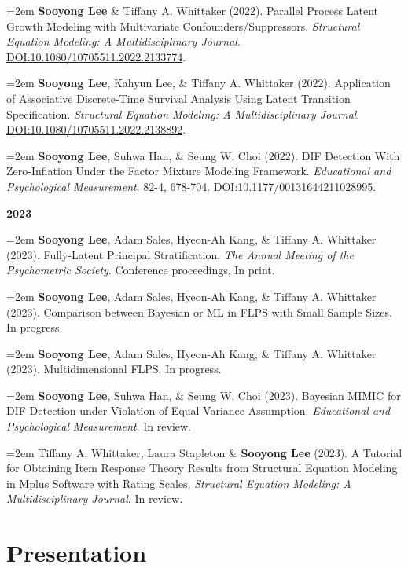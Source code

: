 \documentclass[11pt,letterpaper,]{awesome-me}
\begin{document}
\hangindent=2em  \textbf{Sooyong Lee} \& Tiffany A.
Whittaker (2022). Parallel Process Latent Growth Modeling with
Multivariate Confounders/Suppressors. \emph{Structural Equation
Modeling: A Multidisciplinary Journal}.
\url{DOI:10.1080/10705511.2022.2133774}.

\hangindent=2em  \textbf{Sooyong Lee}, Kahyun Lee, \&
Tiffany A. Whittaker (2022). Application of Associative Discrete-Time
Survival Analysis Using Latent Transition Specification.
\emph{Structural Equation Modeling: A Multidisciplinary Journal}.
\url{DOI:10.1080/10705511.2022.2138892}.

\hangindent=2em  \textbf{Sooyong Lee}, Suhwa Han, \& Seung
W. Choi (2022). DIF Detection With Zero-Inflation Under the Factor
Mixture Modeling Framework. \emph{Educational and Psychological
Measurement}. 82-4, 678-704. \url{DOI:10.1177/00131644211028995}.

\setlength{\leftskip}{0cm}

\textbf{2023}

\setlength{\leftskip}{0.5cm}

\hangindent=2em  \textbf{Sooyong Lee}, Adam Sales, Hyeon-Ah
Kang, \& Tiffany A. Whittaker (2023). Fully-Latent Principal
Stratification. \emph{The Annual Meeting of the Psychometric Society}.
Conference proceedings, In print.

\hangindent=2em  \textbf{Sooyong Lee}, Adam Sales, Hyeon-Ah
Kang, \& Tiffany A. Whittaker (2023). Comparison between Bayesian or ML
in FLPS with Small Sample Sizes. In progress.

\hangindent=2em  \textbf{Sooyong Lee}, Adam Sales, Hyeon-Ah
Kang, \& Tiffany A. Whittaker (2023). Multidimensional FLPS. In
progress.

\hangindent=2em  \textbf{Sooyong Lee}, Suhwa Han, \& Seung
W. Choi (2023). Bayesian MIMIC for DIF Detection under Violation of
Equal Variance Assumption. \emph{Educational and Psychological
Measurement}. In review.

\hangindent=2em  Tiffany A. Whittaker, Laura Stapleton \&
\textbf{Sooyong Lee} (2023). A Tutorial for Obtaining Item Response
Theory Results from Structural Equation Modeling in Mplus Software with
Rating Scales. \emph{Structural Equation Modeling: A Multidisciplinary
Journal}. In review.

\setlength{\leftskip}{0cm}

\hypertarget{presentation}{%
\section{Presentation}\label{presentation}}
\end{document}
